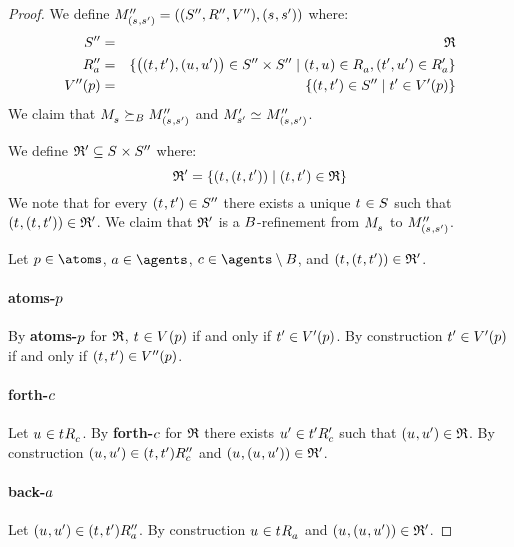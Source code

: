 \begin{proof}
We define $\kPModelAndTuplePP{(\kStateS, \kStateSP)}$ where:
\begin{eqnarray*}
    \kStatesPP &=& \refinement\\
    \kAccessibilityPPA &=& \{\big((\kStateT, \kStateTP), (\kStateU, \kStateUP)\big) \in \kStatesPP \times \kStatesPP \mid (\kStateT, \kStateU) \in \kAccessibilityA, (\kStateTP, \kStateUP) \in \kAccessibilityPA\}\\
    \kValuationPP(\atomP) &=& \{(\kStateT, \kStateTP) \in \kStatesPP \mid \kStateTP \in \kValuationP(\atomP)\}
\end{eqnarray*}
We claim that $\kPModel{\kStateS} \simulatesBs \kPModelPP{(\kStateS, \kStateSP)}$ and $\kPModelP{\kStateSP} \bisimilar \kPModelPP{(\kStateS, \kStateSP)}$.

We define $\refinement' \subseteq \kStates \times \kStatesPP$ where:
$$
\refinement' = \{(\kStateT, (\kStateT, \kStateTP)) \mid (\kStateT, \kStateTP) \in \refinement\}
$$
We note that for every $(\kStateT, \kStateTP) \in \kStatesPP$ there exists a unique $\kStateT \in \kStates$ such that $(\kStateT, (\kStateT, \kStateTP)) \in \refinement'$.
We claim that $\mathfrak{R}'$ is a $B$-refinement from $\kPModel{\kStateS}$ to $\kPModelPP{(\kStateS, \kStateSP)}$.

Let $\atomP \in \atoms$, $\agentA \in \agents$, $\agentC \in \agents \setminus \agentsB$, and $(\kStateT, (\kStateT, \kStateTP)) \in \refinement'$.

\paragraph{atoms-$p$}
By {\bf atoms-$p$} for $\mathfrak{R}$, $\kStateT \in \kValuation(\atomP)$ if and only if ${t}^{\prime} \in {V^{\prime}}(p)$.
By construction ${t}^{\prime} \in {V^{\prime}}(p)$ if and only if $(\kStateT, \kStateTP) \in \kValuationPP(\atomP)$.

\paragraph{forth-$c$}
Let $\kStateU \in \kSuccessorsC{\kStateT}$.
By {\bf forth-$c$} for $\mathfrak{R}$ there exists ${u}^{\prime} \in {{t}^{\prime}} {R^{\prime}_{c}}$ such that $(\kStateU, \kStateUP) \in \refinement$.
By construction $(\kStateU, \kStateUP) \in \kSuccessorsPPC{(\kStateT, \kStateTP)}$ and $(\kStateU, (\kStateU, \kStateUP)) \in \refinement'$.

\paragraph{back-$a$}
Let $(\kStateU, \kStateUP) \in \kSuccessorsPPA{(\kStateT, \kStateTP)}$.
By construction $\kStateU \in \kSuccessorsA{\kStateT}$ and $(\kStateU, (\kStateU, \kStateUP)) \in \refinement'$.


\end{proof}
